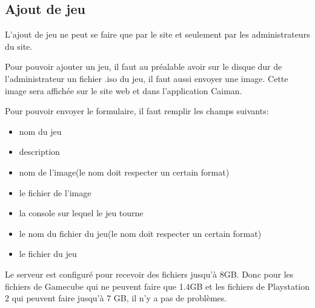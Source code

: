 \documentclass[a4paper,12pt,french]{sphinxmanual}
\begin{document}
\subsection{Ajout de jeu}
\label{\detokenize{organique:ajout-de-jeu}}
\sphinxAtStartPar
L’ajout de jeu ne peut se faire que par le site et seulement par les administrateurs du site.

\sphinxAtStartPar
Pour pouvoir ajouter un jeu, il faut au préalable avoir sur le disque dur de l’administrateur un fichier .iso du jeu, il faut aussi envoyer une image. Cette image sera affichée sur le site web et dans l’application Caiman.

\sphinxAtStartPar
Pour pouvoir envoyer le formulaire, il faut remplir les champs suivants:
\begin{itemize}
\item {} 
\sphinxAtStartPar
nom du jeu

\item {} 
\sphinxAtStartPar
description

\item {} 
\sphinxAtStartPar
nom de l’image(le nom doit respecter un certain format)

\item {} 
\sphinxAtStartPar
le fichier de l’image

\item {} 
\sphinxAtStartPar
la console sur lequel le jeu tourne

\item {} 
\sphinxAtStartPar
le nom du fichier du jeu(le nom doit respecter un certain format)

\item {} 
\sphinxAtStartPar
le fichier du jeu

\end{itemize}

\sphinxAtStartPar
Le serveur est configuré pour recevoir des fichiers jusqu’à 8GB. Donc pour les fichiers de Gamecube qui ne peuvent faire que 1.4GB et les fichiers de Playstation 2 qui peuvent faire jusqu’à 7 GB, il n’y a pas de problèmes.
\end{document}
